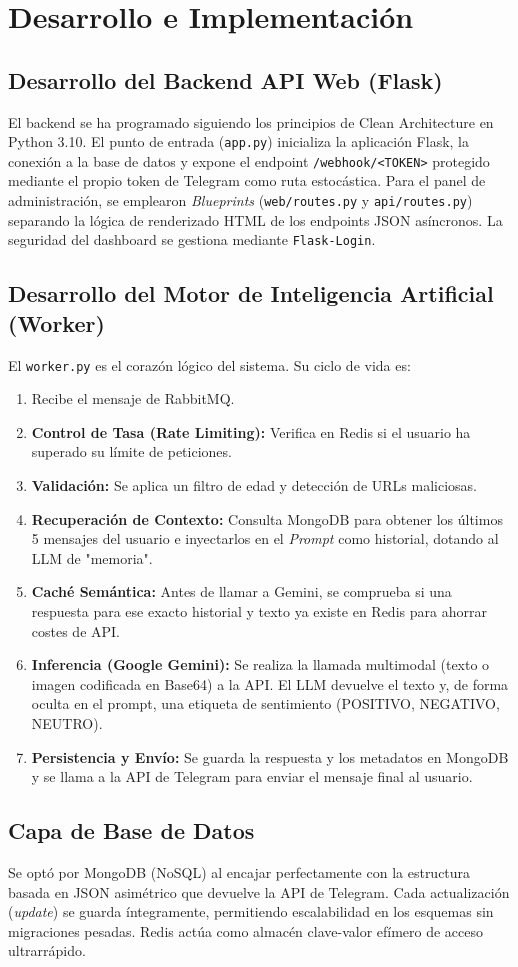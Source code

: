 \section{Desarrollo e Implementación}
\label{sec:implementacion}

\subsection{Desarrollo del Backend API Web (Flask)}
El backend se ha programado siguiendo los principios de Clean Architecture en Python 3.10. 
El punto de entrada (\texttt{app.py}) inicializa la aplicación Flask, la conexión a la base de datos y expone el endpoint \texttt{/webhook/<TOKEN>} protegido mediante el propio token de Telegram como ruta estocástica.
Para el panel de administración, se emplearon \textit{Blueprints} (\texttt{web/routes.py} y \texttt{api/routes.py}) separando la lógica de renderizado HTML de los endpoints JSON asíncronos. La seguridad del dashboard se gestiona mediante \texttt{Flask-Login}.

\subsection{Desarrollo del Motor de Inteligencia Artificial (Worker)}
El \texttt{worker.py} es el corazón lógico del sistema. Su ciclo de vida es:
\begin{enumerate}
    \item Recibe el mensaje de RabbitMQ.
    \item \textbf{Control de Tasa (Rate Limiting):} Verifica en Redis si el usuario ha superado su límite de peticiones.
    \item \textbf{Validación:} Se aplica un filtro de edad y detección de URLs maliciosas.
    \item \textbf{Recuperación de Contexto:} Consulta MongoDB para obtener los últimos 5 mensajes del usuario e inyectarlos en el \textit{Prompt} como historial, dotando al LLM de "memoria".
    \item \textbf{Caché Semántica:} Antes de llamar a Gemini, se comprueba si una respuesta para ese exacto historial y texto ya existe en Redis para ahorrar costes de API.
    \item \textbf{Inferencia (Google Gemini):} Se realiza la llamada multimodal (texto o imagen codificada en Base64) a la API. El LLM devuelve el texto y, de forma oculta en el prompt, una etiqueta de sentimiento (POSITIVO, NEGATIVO, NEUTRO).
    \item \textbf{Persistencia y Envío:} Se guarda la respuesta y los metadatos en MongoDB y se llama a la API de Telegram para enviar el mensaje final al usuario.
\end{enumerate}

\subsection{Capa de Base de Datos}
Se optó por MongoDB (NoSQL) al encajar perfectamente con la estructura basada en JSON asimétrico que devuelve la API de Telegram. Cada actualización (\textit{update}) se guarda íntegramente, permitiendo escalabilidad en los esquemas sin migraciones pesadas. Redis actúa como almacén clave-valor efímero de acceso ultrarrápido.
